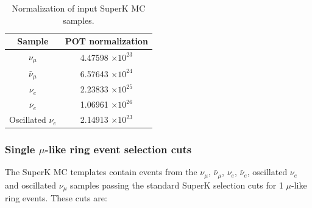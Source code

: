 \begin{table}
\centering
\begin{tabular}{| c | c |}
\hline
Sample             &  POT normalization \\
\hline             
$\nu_{\mu}$            & 4.47598 $\times 10^{23}$ \\
$\bar{\nu}_{\mu}$      & 6.57643 $\times 10^{24}$ \\
$\nu_{e}$              & 2.23833 $\times 10^{25}$ \\
$\bar{\nu}_{e}$        & 1.06961 $\times 10^{26}$ \\
Oscillated $\nu_{e}$   & 2.14913 $\times 10^{23}$ \\
\hline
\end{tabular}
\caption{
  Normalization of input SuperK MC samples.
}
\label{tab:SKMCSummary}
\end{table}

\subsubsection {Single $\mu$-like ring event selection cuts}
\label{sec:mc_templates:1Rmu_cuts}

The SuperK MC templates contain events from the 
$\nu_{\mu}$, $\bar{\nu}_{\mu}$, $\nu_{e}$, $\bar{\nu}_{e}$, oscillated $\nu_{e}$ and oscillated $\nu_{\mu}$ samples
passing the standard SuperK selection cuts for 1 $\mu$-like ring events.
These cuts are:

